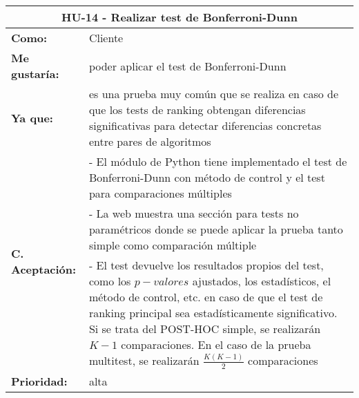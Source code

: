 
\begin{table}[H]
	\begin{tabular}{| p{3cm}| p{12cm} |}
		\hline
		\multicolumn{2}{|c|}{\textbf{HU-14} - Realizar test de Bonferroni-Dunn} \\ \hline
		\textbf{Como:} & Cliente \\ \hline
		\textbf{Me gustaría:} & poder aplicar el test de Bonferroni-Dunn \\ \hline
		\textbf{Ya que:} & es una prueba muy común que se realiza en caso de que los tests de ranking obtengan diferencias significativas para detectar diferencias concretas entre pares de algoritmos \\ \hline
		\multirow{3}{12cm}{\textbf{C. Aceptación:}} & - El módulo de Python tiene implementado el test de Bonferroni-Dunn con método de control y el test para comparaciones múltiples \\
		& - La web muestra una sección para tests no paramétricos donde se puede aplicar la prueba tanto simple como comparación múltiple \\
		& - El test devuelve los resultados propios del test, como los $p-valores$ ajustados, los estadísticos, el método de control, etc. en caso de que el test de ranking principal sea estadísticamente significativo. Si se trata del POST-HOC simple, se realizarán $K-1$ comparaciones. En el caso de la prueba multitest, se realizarán $\frac{K(K-1)}{2}$ comparaciones \\ \hline
		\textbf{\textbf{Prioridad:}} & alta \\ \hline
	\end{tabular}
\end{table}


